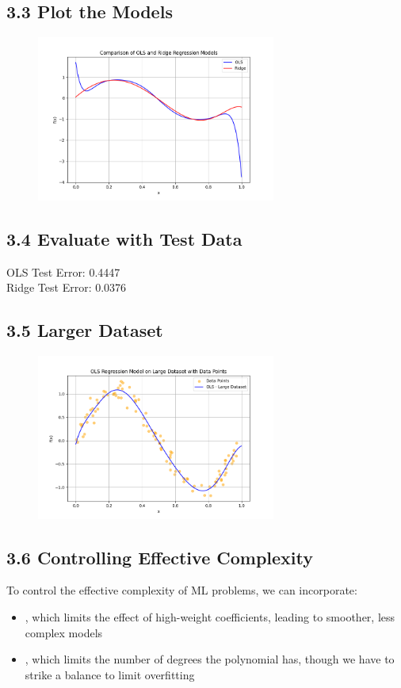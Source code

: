 \documentclass[12pt]{article}
\begin{document}
\subsection*{3.3 Plot the Models}

\begin{figure}[H]
    \centering
    \includegraphics[width=0.7\textwidth]{3.3.png}
\end{figure}

\subsection*{3.4 Evaluate with Test Data}
OLS Test Error: 0.4447 \\
Ridge Test Error: 0.0376

\subsection*{3.5 Larger Dataset}

\begin{figure}[H]
    \centering
    \includegraphics[width=0.7\textwidth]{3.5.png}
\end{figure}

\subsection*{3.6 Controlling Effective Complexity}
To control the effective complexity of ML problems, we can incorporate:
\begin{itemize}
\item {}, which limits the effect of high-weight coefficients, leading to smoother, less complex models
\item {}, which limits the number of degrees the polynomial has, though we have to strike a balance to limit overfitting
\end{itemize}
\end{document}
